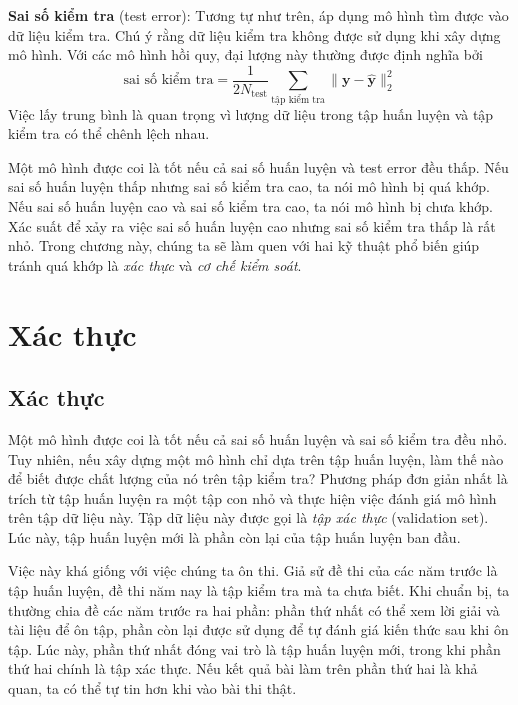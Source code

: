 \textbf{Sai số kiểm tra} (test error): Tương tự như trên, áp dụng mô hình tìm được vào dữ liệu kiểm tra. Chú ý rằng dữ liệu kiểm tra không được sử dụng khi xây dựng mô hình. Với các mô hình hồi quy, đại lượng này thường được định nghĩa bởi 
\begin{equation*} 
\text{sai số kiểm tra}= \frac{1}{2N_{\text{test}}} \sum_{\text{tập kiểm tra}} \|\mathbf{y} - \mathbf{\hat{y}}\|_2^2 
\end{equation*} 
{Việc lấy trung bình là quan trọng vì lượng dữ liệu trong tập huấn
luyện và tập kiểm tra có thể chênh lệch nhau.}
 
Một mô hình được coi là tốt nếu cả {sai số huấn luyện} và {test
error} đều thấp. Nếu {sai số huấn luyện} thấp nhưng {sai số kiểm tra} cao,
ta nói mô hình bị quá khớp. Nếu {sai số huấn luyện} cao và {sai số kiểm tra} cao, ta nói mô hình bị chưa khớp. Xác suất để xảy ra việc
{sai số huấn luyện} cao nhưng {sai số kiểm tra} thấp là rất nhỏ.
Trong chương này, chúng ta sẽ làm quen với hai kỹ thuật phổ biến giúp tránh
quá khớp là \textit{xác thực} và \textit{cơ chế kiểm soát}.
 
\section{Xác thực}
\subsection{Xác thực}

Một mô hình được coi là tốt nếu cả sai số huấn luyện và sai số kiểm tra đều nhỏ. Tuy
nhiên, nếu xây dựng một mô hình {chỉ} dựa trên tập huấn luyện, làm thế nào để
biết được chất lượng của nó trên tập kiểm tra?
Phương pháp đơn giản nhất là {trích} từ tập huấn luyện ra một tập con nhỏ và
thực hiện việc đánh giá mô hình trên tập dữ liệu này. Tập dữ liệu này được gọi
là \textit{tập xác thực} ({validation set}). Lúc này, {tập huấn luyện mới
là phần còn lại của tập huấn luyện ban đầu}.

Việc này khá giống với việc chúng ta ôn thi. Giả sử đề thi của các năm trước là
tập huấn luyện, đề thi năm nay là tập kiểm tra mà ta chưa biết. Khi chuẩn bị,
ta thường chia đề các năm trước ra hai phần: phần thứ nhất có thể xem lời giải
và tài liệu để ôn tập, phần còn lại được sử dụng để tự đánh giá kiến thức sau
khi ôn tập. Lúc này, phần thứ nhất đóng vai trò là tập huấn luyện mới, trong khi
phần thứ hai chính là tập xác thực. Nếu kết quả bài làm trên phần thứ hai là
khả quan, ta có thể tự tin hơn khi vào bài thi thật.




